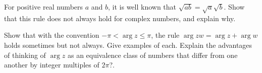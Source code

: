 \documentclass[space,nooutcomes]{ximera}
\begin{document}
%
%
%
%


\begin{problem}
For positive real numbers $a$ and $b$, it is well known that $\sqrt{ab}=\sqrt{a}\sqrt{b}$.  Show that this rule does not always hold for complex numbers, and explain why.  
\vfill 
\end{problem}

\begin{problem}
Show that with the convention $-\pi<\arg{z}\le\pi$, the rule $\arg{zw}=\arg{z}+\arg{w}$ holds sometimes but not always.  Give examples of each.  Explain the advantages of thinking of $\arg{z}$ as an equivalence class of numbers that differ from one another by integer multiples of $2\pi$?.
\vfill 
\end{problem}
%
%
%
\end{document}
